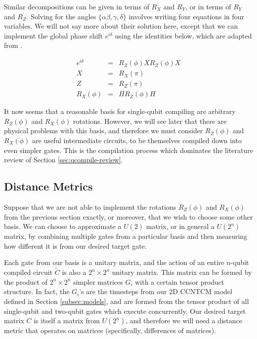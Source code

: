 Similar decompositions can be given in terms of $R_X$ and $R_Y$, or in
terms of $R_Y$ and $R_Z$. Solving for the angles $\{ \alpha \beta, \gamma, \delta \}$
involves writing four equations in four variables. We will not say
more about their solution here, except that we can implement the
global phase shift $e^{i\delta}$ using the identities below, which are
adapted from \cite{Kitaev2002}.

\begin{eqnarray}
e^{i\delta} & = & R_Z(\phi)X R_Z(\phi) X \\
X & = & R_X(\pi) \\
Z & = & R_Z(\pi) \\
R_X(\phi) & = & H R_Z(\phi) H
\end{eqnarray}

It now seems that a reasonable basis for single-qubit compiling are
arbitrary $R_Z(\phi)$ and $R_X(\phi)$ rotations. However, we will see later
that there are physical problems with this basis, and therefore we must
consider $R_Z(\phi)$ and $R_X(\phi)$ are useful intermediate circuits,
to be themselves compiled down into even simpler gates. This is the
compilation process which dominates the literature review of 
Section \ref{sec:qcompile-review}.

\subsection{Distance Metrics}
\label{subsec:distance}

Suppose that we are not able to implement the rotations $R_Z(\phi)$
and $R_X(\phi)$ from the previous section exactly, or moreover, that we
wish to choose some other basis. We can choose to approximate a
$U(2)$ matrix, or in general a $U(2^n)$ matrix, by combining multiple
gates from a particular basis and then measuring how different it is
from our desired target gate.

Each gate from our basis is a unitary matrix, and the action of an entire
$n$-qubit compiled circuit $\tilde{C}$
is also a $2^n \times 2^n$ unitary matrix. This matrix can be formed
by the product of $2^n \times 2^n$ simpler matrices $G_i$ with a certain
tensor product structure. In fact, the $G_i$'s are the timesteps from
our \textsf{2D CCNTCM} model defined in Section \ref{subsec:models}, and
are formed from the tensor product of all single-qubit and two-qubit gates
which execute concurrently. Our desired target matrix $C$
is itself
a matrix from $U(2^n)$, and therefore we will need a distance metric
that operates on matrices (specifically, differences of matrices).

